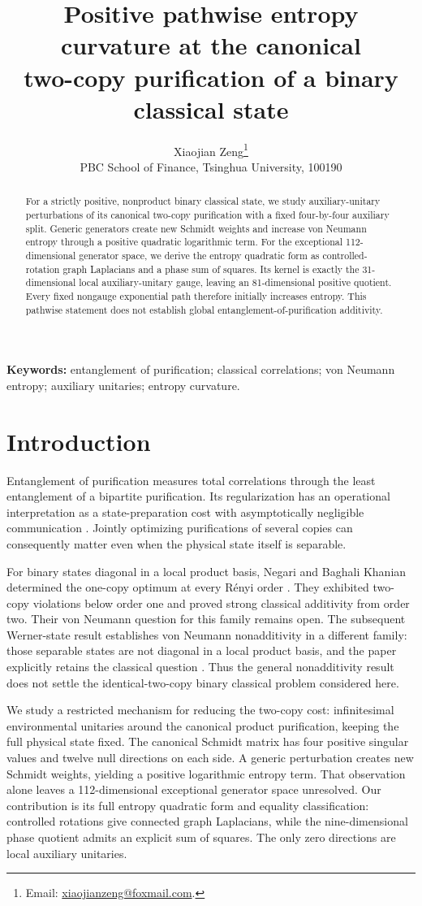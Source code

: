 \documentclass[11pt]{article}
\title{Positive pathwise entropy curvature at the canonical\protect\\
two-copy purification of a binary classical state}
\author{Xiaojian Zeng\thanks{Email: \href{mailto:xiaojianzeng@foxmail.com}{xiaojianzeng@foxmail.com}.}\\
\small PBC School of Finance, Tsinghua University, 100190}
\date{}
\begin{document}
\maketitle
\begin{abstract}
For a strictly positive, nonproduct binary classical state, we study auxiliary-unitary perturbations of its canonical two-copy purification with a fixed four-by-four auxiliary split. Generic generators create new Schmidt weights and increase von Neumann entropy through a positive quadratic logarithmic term. For the exceptional 112-dimensional generator space, we derive the entropy quadratic form as controlled-rotation graph Laplacians and a phase sum of squares. Its kernel is exactly the 31-dimensional local auxiliary-unitary gauge, leaving an 81-dimensional positive quotient. Every fixed nongauge exponential path therefore initially increases entropy. This pathwise statement does not establish global entanglement-of-purification additivity.
\end{abstract}
\noindent\textbf{Keywords:} entanglement of purification; classical correlations;
von Neumann entropy; auxiliary unitaries; entropy curvature.

\section{Introduction}
Entanglement of purification measures total correlations through the least entanglement of a bipartite purification. Its regularization has an operational interpretation as a state-preparation cost with asymptotically negligible communication \cite{Terhal2002}. Jointly optimizing purifications of several copies can consequently matter even when the physical state itself is separable.

For binary states diagonal in a local product basis, Negari and Baghali Khanian determined the one-copy optimum at every R\'enyi order \cite{Negari2026}. They exhibited two-copy violations below order one and proved strong classical additivity from order two. Their von Neumann question for this family remains open. The subsequent Werner-state result establishes von Neumann nonadditivity in a different family: those separable states are not diagonal in a local product basis, and the paper explicitly retains the classical question \cite{Khanian2026}. Thus the general nonadditivity result does not settle the identical-two-copy binary classical problem considered here.

We study a restricted mechanism for reducing the two-copy cost: infinitesimal environmental unitaries around the canonical product purification, keeping the full physical state fixed. The canonical Schmidt matrix has four positive singular values and twelve null directions on each side. A generic perturbation creates new Schmidt weights, yielding a positive logarithmic entropy term. That observation alone leaves a 112-dimensional exceptional generator space unresolved. Our contribution is its full entropy quadratic form and equality classification: controlled rotations give connected graph Laplacians, while the nine-dimensional phase quotient admits an explicit sum of squares. The only zero directions are local auxiliary unitaries.
\end{document}
